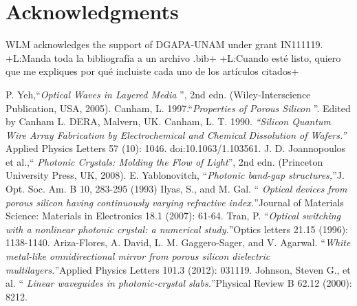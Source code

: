 \documentclass{article}
\newcommand{\notaL}[1]{{\color{blue}+L:#1+}}
\begin{document}
\section*{Acknowledgments}
\label{sec:acknowledgments}
WLM acknowledges the support of DGAPA-UNAM under grant IN111119.
%
\notaL{Manda toda la bibliografía a un archivo .bib}
\notaL{Cuando esté listo, quiero que me expliques por qué incluiste
  cada uno de los artículos citados}

\begin{thebibliography}{XX}
 P. Yeh,\textquotedblleft \emph{Optical Waves in Layered
    Media} \textquotedblright, 2nd edn. (Wiley-Interscience
  Publication,
  USA, 2005).
Canham, L. 1997.\textquotedblleft \emph{Properties of
    Porous Silicon} \textquotedblright. Edited by Canham L. DERA,
  Malvern, UK.
Canham, L. T. 1990. \emph{\textquotedblleft Silicon
    Quantum Wire Array Fabrication by Electrochemical and Chemical
    Dissolution of Wafers.\textquotedblright} Applied Physics
  Letters 57 (10): 1046. doi:10.1063/1.103561.
 J. D. Joannopoulos et al.,\textquotedblleft
  \emph{Photonic Crystals: Molding the Flow of
    Light}\textquotedblright, 2nd edn.
  (Princeton University Press, UK, 2008).
 E. Yablonovitch, \textquotedblleft \emph{Photonic
    band-gap structures,}\textquotedblright J. Opt. Soc. Am. B 10,
  283-295 (1993)
 Ilyas, S., and M. Gal.  \textquotedblleft \emph{
    Optical devices from porous silicon having continuously varying
    refractive index.}\textquotedblright Journal of Materials
  Science: Materials in Electronics 18.1 (2007): 61-64.
 Tran, P. \textquotedblleft \emph{Optical switching with
    a nonlinear photonic crystal: a numerical
    study.}\textquotedblright Optics letters 21.15 (1996):
  1138-1140.
 Ariza-Flores, A. David, L. M. Gaggero-Sager, and
  V. Agarwal. \textquotedblleft \emph{White metal-like
    omnidirectional mirror from porous silicon dielectric
    multilayers.}\textquotedblright Applied Physics Letters 101.3
  (2012): 031119.
 Johnson, Steven G., et al.  \textquotedblleft
  \emph{Linear waveguides in photonic-crystal
    slabs.}\textquotedblright Physical Review B 62.12 (2000): 8212.


\end{thebibliography}
\end{document}
